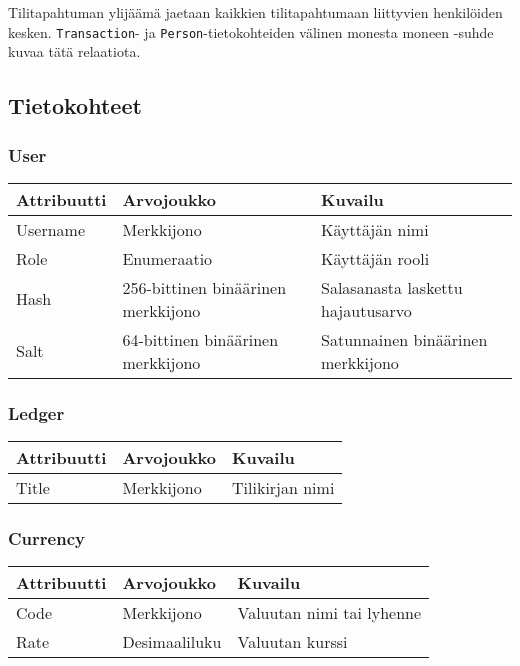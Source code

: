\documentclass[a4paper,parskip=half]{scrartcl}
\begin{document}
Tilitapahtuman ylijäämä jaetaan kaikkien tilitapahtumaan
liittyvien henkilöiden kesken. \texttt{Transaction}- ja
\texttt{Person}-tietokohteiden välinen monesta moneen -suhde kuvaa tätä
relaatiota.

\subsection{Tietokohteet}

\subsubsection{User}
\begin{tabular}{ | l | l | l | }
  \hline
  \textbf{Attribuutti} & \textbf{Arvojoukko} & \textbf{Kuvailu} \\ \hline
  Username & Merkkijono & Käyttäjän nimi \\ \hline
  Role & Enumeraatio & Käyttäjän rooli \\ \hline
  Hash & 256-bittinen binäärinen merkkijono &
    Salasanasta laskettu hajautusarvo
    \\ \hline
  Salt & 64-bittinen binäärinen merkkijono & Satunnainen binäärinen merkkijono
    \\ \hline
\end{tabular}

\subsubsection{Ledger}
\begin{tabular}{ | l | l | l | }
  \hline
  \textbf{Attribuutti} & \textbf{Arvojoukko} & \textbf{Kuvailu} \\ \hline
  Title & Merkkijono & Tilikirjan nimi \\ \hline
\end{tabular}

\subsubsection{Currency}
\begin{tabular}{ | l | l | l | }
  \hline
  \textbf{Attribuutti} & \textbf{Arvojoukko} & \textbf{Kuvailu} \\ \hline
  Code & Merkkijono & Valuutan nimi tai lyhenne \\ \hline
  Rate & Desimaaliluku & Valuutan kurssi \\ \hline
\end{tabular}
\end{document}
